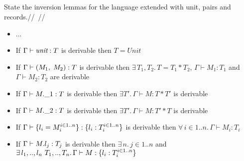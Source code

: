 \subsection{}

State the inversion lemmas for the language extended with unit, pairs and records.//~//

\begin{itemize}
	\item ...
	\item If $\Gamma \vdash \emph{unit}: T$ is derivable then $T = Unit$
	\item If $\Gamma \vdash (M_1,\;M_2): T$ is derivable then
	      $\exists\,T_1, T_2.\, T = T_1 \ast T_2$, $\Gamma \vdash M_1: T_1$ and
	      $\Gamma \vdash M_2: T_2$ are derivable
	\item If $\Gamma \vdash M.\_1: T$ is derivable then
	      $\exists T'.\, \Gamma \vdash M: T \ast T'$ is derivable
	\item If $\Gamma \vdash M.\_2: T$ is derivable then
	      $\exists T'.\, \Gamma \vdash M: T' \ast T$ is derivable
	\item If $\Gamma \vdash \{l_i=M_i^{i \in 1..n}\}: \{l_i:T_i^{i \in 1..n}\}$ is derivable
	      then $\forall\, i \in 1..n.\, \Gamma \vdash M_i: T_i$
	\item If $\Gamma \vdash M.l_j: T_j$ is derivable then $\exists\, n.\,j \in 1..n$ and
	      $\exists\, l_1,..,l_n\ T_1,..,T_n.\,\Gamma \vdash M: \{l_i: T_i^{i \in 1..n}\}$
\end{itemize}

